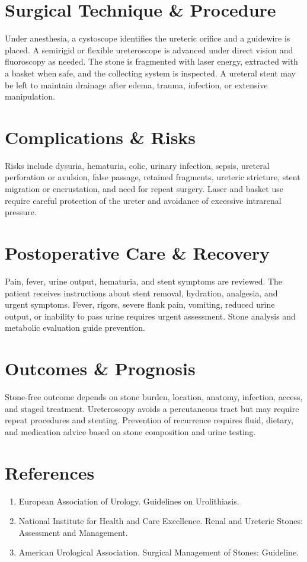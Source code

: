 \section*{Surgical Technique \& Procedure}
Under anesthesia, a cystoscope identifies the ureteric orifice and a guidewire is placed. A semirigid or flexible ureteroscope is advanced under direct vision and fluoroscopy as needed. The stone is fragmented with laser energy, extracted with a basket when safe, and the collecting system is inspected. A ureteral stent may be left to maintain drainage after edema, trauma, infection, or extensive manipulation.

\section*{Complications \& Risks}
Risks include dysuria, hematuria, colic, urinary infection, sepsis, ureteral perforation or avulsion, false passage, retained fragments, ureteric stricture, stent migration or encrustation, and need for repeat surgery. Laser and basket use require careful protection of the ureter and avoidance of excessive intrarenal pressure.

\section*{Postoperative Care \& Recovery}
Pain, fever, urine output, hematuria, and stent symptoms are reviewed. The patient receives instructions about stent removal, hydration, analgesia, and urgent symptoms. Fever, rigors, severe flank pain, vomiting, reduced urine output, or inability to pass urine requires urgent assessment. Stone analysis and metabolic evaluation guide prevention.

\section*{Outcomes \& Prognosis}
Stone-free outcome depends on stone burden, location, anatomy, infection, access, and staged treatment. Ureteroscopy avoids a percutaneous tract but may require repeat procedures and stenting. Prevention of recurrence requires fluid, dietary, and medication advice based on stone composition and urine testing.

\section*{References}
\begin{enumerate}
  \item European Association of Urology. Guidelines on Urolithiasis.
  \item National Institute for Health and Care Excellence. Renal and Ureteric Stones: Assessment and Management.
  \item American Urological Association. Surgical Management of Stones: Guideline.
\end{enumerate}

\clearpage
